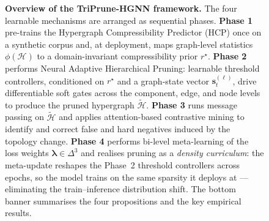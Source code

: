 \documentclass[10pt]{article}
\theoremstyle{plain}
\theoremstyle{definition}
\begin{document}
\begin{figure}[t]
{%
}
\caption{\textbf{Overview of the TriPrune-HGNN framework.} The four learnable mechanisms are arranged as sequential phases. \textbf{Phase 1} pre-trains the Hypergraph Compressibility Predictor (HCP) once on a synthetic corpus and, at deployment, maps graph-level statistics $\phi(\mathcal{H})$ to a domain-invariant compressibility prior $r^{\star}$. \textbf{Phase 2} performs Neural Adaptive Hierarchical Pruning: learnable threshold controllers, conditioned on $r^{\star}$ and a graph-state vector $\mathbf{s}_t^{(\ell)}$, drive differentiable soft gates across the component, edge, and node levels to produce the pruned hypergraph $\widetilde{\mathcal{H}}$. \textbf{Phase 3} runs message passing on $\widetilde{\mathcal{H}}$ and applies attention-based contrastive mining to identify and correct false and hard negatives induced by the topology change. \textbf{Phase 4} performs bi-level meta-learning of the loss weights $\boldsymbol{\lambda}\!\in\!\Delta^3$ and realises pruning as a \emph{density curriculum}: the meta-update reshapes the Phase~2 threshold controllers across epochs, so the model trains on the same sparsity it deploys at --- eliminating the train--inference distribution shift. The bottom banner summarises the four propositions and the key empirical results.}
\label{fig:triprune_framework}
\vspace{-4pt}
\end{figure}
\end{document}
